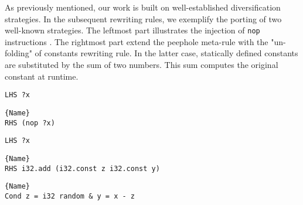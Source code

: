 As previously mentioned, our work is built on well-established diversification strategies. 
In the subsequent rewriting rules, we exemplify the porting of two well-known strategies. 
The leftmost part illustrates the injection of \texttt{nop} instructions \cite{10.1145/2086696.2086702}. 
The rightmost part extend the peephole meta-rule with the "un-folding" of constants rewriting rule. 
In the latter case, statically defined constants are substituted by the sum of two numbers. 
This sum computes the original constant at runtime.



\begin{minipage}{0.95\linewidth}
\begin{minipage}{0.49\linewidth}
    
    \lstset{
    language=ttt,
    style=watcode,
    basicstyle=\footnotesize\ttfamily,
    columns=fullflexible,
    breaklines=true}
    \begin{lstlisting}[]
LHS ?x
            \end{lstlisting}\vspace{-0.5cm}
    \noindent\hrulefill
        \lstset{
            language=ttt,
            style=watcode,
            basicstyle=\footnotesize\ttfamily,
            columns=fullflexible,
            breaklines=true}
            \vspace{-0.2cm}
            \begin{lstlisting}[numbers=none]{Name}
RHS (nop ?x)
    \end{lstlisting}
\end{minipage}
\begin{minipage}{0.49\linewidth}
    \lstset{
    language=ttt,
    style=watcode,
    basicstyle=\footnotesize\ttfamily,
    columns=fullflexible,
    breaklines=true}
    \begin{lstlisting}[]
LHS ?x
            \end{lstlisting}\vspace{-0.5cm}
    \noindent\hrulefill
        \lstset{
            language=ttt,
            style=watcode,
            basicstyle=\footnotesize\ttfamily,
            columns=fullflexible,
            breaklines=true}
            \vspace{-0.2cm}
            \begin{lstlisting}[numbers=none]{Name}
RHS i32.add (i32.const z i32.const y) 
    \end{lstlisting}\vspace{-0.5cm}
    \noindent\hrulefill
\lstset{
        language=ttt,
        style=watcode,
        basicstyle=\footnotesize\ttfamily,
        columns=fullflexible,
        breaklines=true}
        \begin{lstlisting}[numbers=none]{Name}
Cond z = i32 random & y = x - z 
        \end{lstlisting}
\end{minipage}    
\end{minipage}


